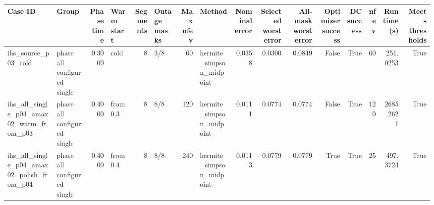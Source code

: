 \begin{tabular}{llrlrlrlrrrrrrrr}
\toprule
Case ID & Group & Phase time & Warm start & Segments & Outage masks & Max nfev & Method & Nominal error & Selected worst error & All-mask worst error & Optimizer success & DC success & nfev & Runtime (s) & Meets thresholds \\
\midrule
ihs\_source\_p03\_cold & phase all configured single & 0.3000 & cold & 8 & 3/8 & 60 & hermite\_simpson\_midpoint & 0.0358 & 0.0300 & 0.0849 & False & True & 60 & 251.0253 & True \\
ihs\_all\_single\_p04\_amax02\_warm\_from\_p03 & phase all configured single & 0.4000 & from 0.3 & 8 & 8/8 & 120 & hermite\_simpson\_midpoint & 0.0111 & 0.0774 & 0.0774 & False & True & 120 & 2685.2621 & True \\
ihs\_all\_single\_p04\_amax02\_polish\_from\_p04 & phase all configured single & 0.4000 & from 0.4 & 8 & 8/8 & 240 & hermite\_simpson\_midpoint & 0.0113 & 0.0779 & 0.0779 & True & True & 25 & 497.3724 & True \\
\bottomrule
\end{tabular}
